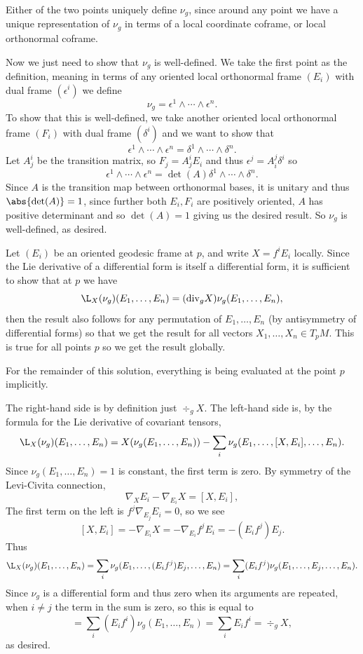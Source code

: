     Either of the two points uniquely define $\nu_g$, since around any point we have a unique representation of $\nu_g$ in terms of a local coordinate coframe, or local orthonormal coframe.

    Now we just need to show that $\nu_g$ is well-defined.
    We take the first point as the definition, meaning in terms of any oriented local orthonormal frame $(E_i)$ with dual frame $(\epsilon^i)$ we define
    $$ \nu_g = \epsilon^1\wedge\cdots\wedge\epsilon^n . $$
    To show that this is well-defined, we take another oriented local orthonormal frame $(F_i)$ with dual frame $(\delta^i)$ and we want to show that
    $$ \epsilon^1\wedge\cdots\wedge\epsilon^n = \delta^1\wedge\cdots\wedge\delta^n . $$
    Let $A^i_j$ be the transition matrix, so $F_j=A^i_jE_i$ and thus $\epsilon^j=A^j_i\delta^i$ so
    $$ \epsilon^1\wedge\cdots\wedge\epsilon^n = \det(A)\delta^1\wedge\cdots\wedge\delta^n . $$
    Since $A$ is the transition map between orthonormal bases, it is unitary and thus $\abs{\det(A)}=1$, since further both $E_i,F_i$ are positively oriented, $A$ has positive
    determinant and so $\det(A)=1$ giving us the desired result.
    So $\nu_g$ is well-defined, as desired.

    \item Let $(E_i)$ be an oriented geodesic frame at $p$, and write $X=f^iE_i$ locally.
    Since the Lie derivative of a differential form is itself a differential form, it is sufficient to show that at $p$ we have
    $$ \L_X(\nu_g)(E_1,\dots,E_n) = (\div_gX)\nu_g(E_1,\dots,E_n) , $$
    then the result also follows for any permutation of $E_1,\dots,E_n$ (by antisymmetry of differential forms) so that we get the result for all vectors $X_1,\dots,X_n\in T_pM$.
    This is true for all points $p$ so we get the result globally.

    For the remainder of this solution, everything is being evaluated at the point $p$ implicitly.

    The right-hand side is by definition just $\div_gX$.
    The left-hand side is, by the formula for the Lie derivative of covariant tensors,
    $$ \L_X(\nu_g)(E_1,\dots,E_n) = X(\nu_g(E_1,\dots,E_n)) - \sum_i\nu_g(E_1,\dots,[X,E_i],\dots,E_n) . $$
    Since $\nu_g(E_1,\dots,E_n)=1$ is constant, the first term is zero.
    By symmetry of the Levi-Civita connection,
    $$ \nabla_XE_i - \nabla_{E_i}X = [X,E_i] , $$
    The first term on the left is $f^j\nabla_{E_j}E_i=0$, so we see
    $$ [X,E_i] = -\nabla_{E_i}X = -\nabla_{E_i}f^jE_i = -(E_if^j)E_j . $$
    Thus
    $$ \L_X(\nu_g)(E_1,\dots,E_n) = \sum_i\nu_g(E_1,\dots,(E_if^j)E_j,\dots,E_n) = \sum_i(E_if^j)\nu_g(E_1,\dots,E_j,\dots,E_n) . $$
    Since $\nu_g$ is a differential form and thus zero when its arguments are repeated, when $i\neq j$ the term in the sum is zero, so this is equal to
    $$ = \sum_i(E_if^i)\nu_g(E_1,\dots,E_n) = \sum_iE_if^i = \div_gX , $$
    as desired.
\eenum



